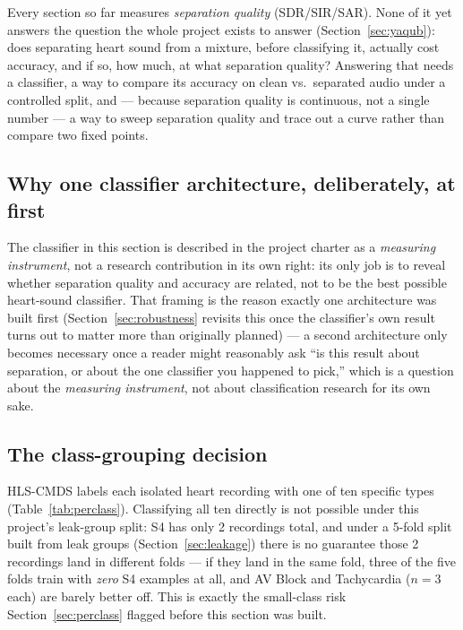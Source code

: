 \documentclass[11pt]{article}
\begin{document}
Every section so far measures \emph{separation quality} (SDR/SIR/SAR).
None of it yet answers the question the whole project exists to answer
(Section~\ref{sec:yaqub}): does separating heart sound from a mixture,
before classifying it, actually cost accuracy, and if so, how much, at
what separation quality? Answering that needs a classifier, a way to
compare its accuracy on clean vs.\ separated audio under a controlled
split, and --- because separation quality is continuous, not a single
number --- a way to sweep separation quality and trace out a curve rather
than compare two fixed points.

\subsection{Why one classifier architecture, deliberately, at first}
\label{sec:onearchitecture}

The classifier in this section is described in the project charter as a
\emph{measuring instrument}, not a research contribution in its own
right: its only job is to reveal whether separation quality and accuracy
are related, not to be the best possible heart-sound classifier. That
framing is the reason exactly one architecture was built first
(Section~\ref{sec:robustness} revisits this once the classifier's own
result turns out to matter more than originally planned) --- a second
architecture only becomes necessary once a reader might reasonably ask
``is this result about separation, or about the one classifier you
happened to pick,'' which is a question about the \emph{measuring
instrument}, not about classification research for its own sake.

\subsection{The class-grouping decision}
\label{sec:classgrouping}

HLS-CMDS labels each isolated heart recording with one of ten specific
types (Table~\ref{tab:perclass}). Classifying all ten directly is not
possible under this project's leak-group split: S4 has only 2 recordings
total, and under a 5-fold split built from leak groups (Section~\ref{sec:leakage})
there is no guarantee those 2 recordings land in different folds --- if
they land in the same fold, three of the five folds train with \emph{zero}
S4 examples at all, and AV Block and Tachycardia ($n{=}3$ each) are barely
better off. This is exactly the small-class risk Section~\ref{sec:perclass}
flagged before this section was built.
\end{document}
